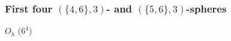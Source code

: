 \documentclass{beamer}
\begin{document}
\begin{frame}\frametitle{First four $(\{4,6\},3)$- and
$(\{5,6\},3)$-spheres}


\begin{center}
\begin{minipage}[b]{24mm}
\centering
{}\par
$O_h$ ($6^4$)
\end{minipage}
\begin{minipage}[b]{25mm}
\centering
{}\par

\end{minipage}
\end{center}
\end{frame}
\end{document}
